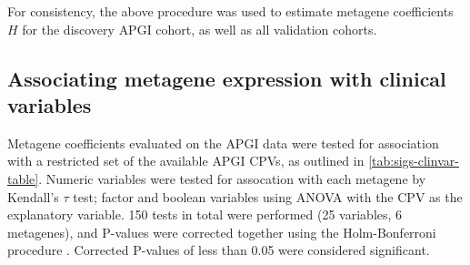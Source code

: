 \documentclass[dissertation.tex]{subfiles}
\begin{document}
For consistency, the above procedure was used to estimate metagene coefficients $H$ for the discovery \gls{APGI} cohort, as well as all validation cohorts.

\subsection{Associating metagene expression with clinical variables}
Metagene coefficients evaluated on the \gls{APGI} data were tested for association with a restricted set of the available \gls{APGI} \glspl{CPV}, as outlined in \cref{tab:sigs-clinvar-table}.  Numeric variables were tested for assocation with each metagene by Kendall's $\tau$ test; factor and boolean variables using ANOVA with the \gls{CPV} as the explanatory variable.  150 tests in total were performed (25 variables, 6 metagenes), and P-values were corrected together using the Holm-Bonferroni procedure \cite{Holm1979}.  Corrected P-values of less than 0.05 were considered significant.
\end{document}
